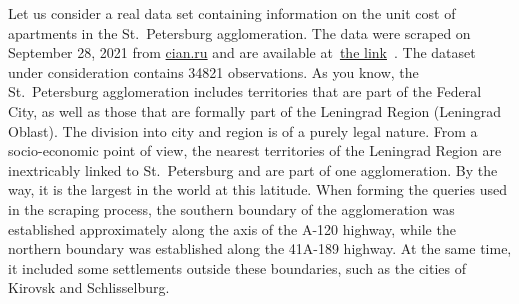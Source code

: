 \documentclass[]{scrreprt}
\begin{document}
Let us consider a real data set containing information on the unit cost of apartments in the St.~Petersburg agglomeration. The data were scraped on September 28, 2021 from \href{https://www.cian.ru/}{cian.ru} and are available at~\href{https://github.com/Kirill-Murashev/datasets/blob/main/Saint-Petersburg/flats/spba_flats_210928.csv}{the link}~\cite{ds:spba-flats-210928}. The dataset under consideration contains 34821 observations. As you know, the St.~Petersburg agglomeration includes territories that are part of the Federal City, as well as those that are formally part of the Leningrad Region (Leningrad Oblast). The division into city and region is of a purely legal nature. From a socio-economic point of view, the nearest territories of the Leningrad Region are inextricably linked to St.~Petersburg and are part of one agglomeration. By the way, it is the largest in the world at this latitude. When forming the queries used in the scraping process, the southern boundary of the agglomeration was established approximately along the axis of the A-120 highway, while the northern boundary was established along the 41A-189 highway. At the same time, it included some settlements outside these boundaries, such as the cities of Kirovsk and Schlisselburg.
\end{document}

